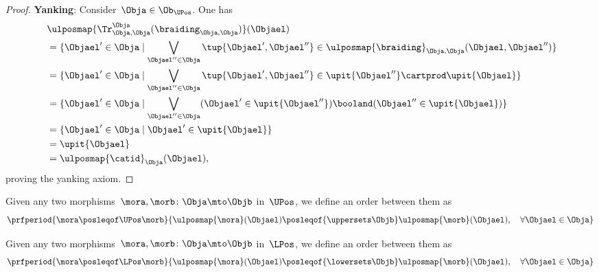 \begin{proof}
	\textbf{Yanking}:
	Consider~$\Obja\in \Ob_{\UPos}$.
	One has
	\begin{equation*}
		\begin{aligned}
			~ & \ulposmap{\Tr_{\Obja,\Obja}^{\Obja}(\braiding_{\Obja,\Obja})}(\Objael)                                                                     \\
			  & =\{ \Objael'\in \Obja \mid \bigvee_{\Objael''\in \Obja}\tup{\Objael',\Objael''}\in \ulposmap{\braiding}_{\Obja,\Obja}(\Objael,\Objael'')\} \\
			  & =\{ \Objael'\in \Obja \mid \bigvee_{\Objael''\in \Obja}\tup{\Objael',\Objael''}\in \upit\{\Objael''\}\cartprod \upit\{ \Objael\}\}         \\
			  & =\{ \Objael'\in \Obja \mid \bigvee_{\Objael''\in \Obja} (\Objael'\in \upit\{\Objael''\}) \booland(\Objael'' \in \upit\{ \Objael\})\}       \\
			  & =\{ \Objael'\in \Obja \mid \Objael'\in \upit\{\Objael\}\}                                                                                  \\
			  & =\upit \{\Objael\}                                                                                                                         \\
			  & =\ulposmap{\catid}_\Obja(\Objael),
		\end{aligned}
	\end{equation*}
	proving the yanking axiom.
\end{proof}

\begin{definition}
	\label{def:upos_order}
	Given any two morphisms~$\mora,\morb\colon \Obja \mto \Objb$ in~$\UPos$, we define an order between them as
	\begin{equation*}
		\prfperiod{\mora \posleqof\UPos \morb}{\ulposmap{\mora}(\Objael)\posleqof{\uppersets \Objb} \ulposmap{\morb}(\Objael), \quad \forall \Objael \in \Obja}
	\end{equation*}
\end{definition}

\begin{definition}
	\label{def:lpos_order}
	Given any two morphisms~$\mora,\morb\colon \Obja \mto \Objb$ in~$\LPos$, we define an order between them as
	\begin{equation*}
		\prfperiod{\mora \posleqof\LPos \morb}{\ulposmap{\mora}(\Objael)\posleqof{\lowersets \Objb} \ulposmap{\morb}(\Objael), \quad \forall \Objael \in \Obja}
	\end{equation*}
\end{definition}

